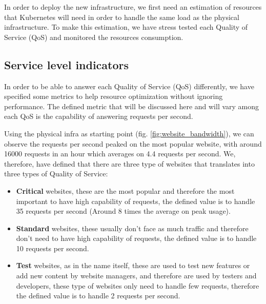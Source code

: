 \newenvironment{conditions}
  {\par\vspace{\abovedisplayskip}\noindent\begin{tabular}{>{$}l<{$} @{${}={}$} l}}
  {\end{tabular}\par\vspace{\belowdisplayskip}}

In order to deploy the new infrastructure, we first need an estimation of resources that Kubernetes will need in order to handle the same load as the physical infrastructure.
To make this estimation, we have stress tested each Quality of Service (QoS) and monitored the resources consumption. 

\subsection{Service level indicators}

In order to be able to answer each Quality of Service (QoS) differently, we have specified some metrics to help resource optimization without ignoring performance.
The defined metric that will be discussed here and will vary among each QoS is the capability of answering requests per second.

Using the physical infra as starting point (fig. \ref{fig:website_bandwidth}), we can observe the requests per second peaked on the most popular website, with around 16000 requests in an hour which averages on 4.4 requests per second.
We, therefore, have defined that there are three type of websites that translates into three types of Quality of Service:
\begin{itemize}
    \item \textbf{Critical} websites, these are the most popular and therefore the most important to have high capability of requests, the defined value is to handle 35 requests per second (Around 8 times the average on peak usage).
    \item \textbf{Standard} websites, these usually don't face as much traffic and therefore don't need to have high capability of requests, the defined value is to handle 10 requests per second. 
    \item \textbf{Test} websites, as in the name itself, these are used to test new features or add new content by website managers, and therefore are used by testers and developers, these type of websites only need to handle few requests, therefore the defined value is to handle 2 requests per second.
\end{itemize}

